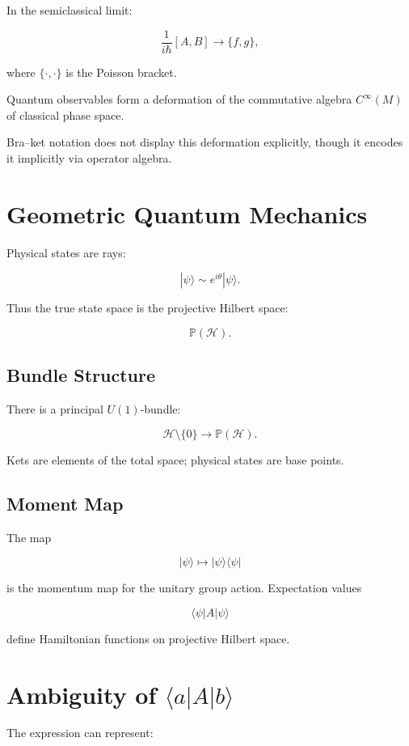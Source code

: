 \documentclass[12pt]{article}
\begin{document}
In the semiclassical limit:

\[
\frac{1}{i\hbar}[A,B] \to \{f,g\},
\]

where $\{\cdot,\cdot\}$ is the Poisson bracket.

Quantum observables form a deformation of the commutative algebra
$C^\infty(M)$ of classical phase space.

Bra--ket notation does not display this deformation explicitly,
though it encodes it implicitly via operator algebra.

\section{Geometric Quantum Mechanics}

Physical states are rays:

\[
|\psi\rangle \sim e^{i\theta}|\psi\rangle.
\]

Thus the true state space is the projective Hilbert space:

\[
\mathbb P(\mathcal H).
\]

\subsection{Bundle Structure}

There is a principal $U(1)$-bundle:

\[
\mathcal H \setminus \{0\} \to \mathbb P(\mathcal H).
\]

Kets are elements of the total space;
physical states are base points.

\subsection{Moment Map}

The map

\[
|\psi\rangle \mapsto |\psi\rangle\langle\psi|
\]

is the momentum map for the unitary group action.
Expectation values

\[
\langle \psi|A|\psi\rangle
\]

define Hamiltonian functions on projective Hilbert space.

\section{Ambiguity of $\langle a|A|b\rangle$}

The expression can represent:
\end{document}
